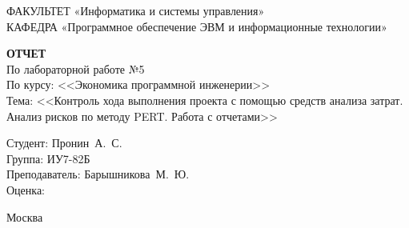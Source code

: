 \begin{titlepage}
	{\doublespacing \small \raggedright ФАКУЛЬТЕТ \hspace{25mm} «Информатика и системы управления»\\
	КАФЕДРА \hspace{5mm} «Программное обеспечение ЭВМ и информационные технологии»\\}

	\vspace{30mm}
	
	\textbf{ОТЧЕТ}\\
	По лабораторной работе №5\\
	По курсу: <<Экономика программной инженерии>>\\
	Тема: <<Контроль хода выполнения проекта с помощью средств анализа затрат. Анализ рисков по методу PERT. Работа с отчетами>>\\

	\vspace{60mm}

	\hspace{70mm} Студент:       \hfill Пронин~А.~С.\\
	\hspace{70mm} Группа:        \hfill ИУ7-82Б\\
	\hspace{70mm} Преподаватель: \hfill Барышникова~М.~Ю.\\
	\hspace{70mm} Оценка:        \hfill \hrulefill\\

	\vfill
	
	Москва\\
	\the\year
\end{titlepage}

\setcounter{page}{2}